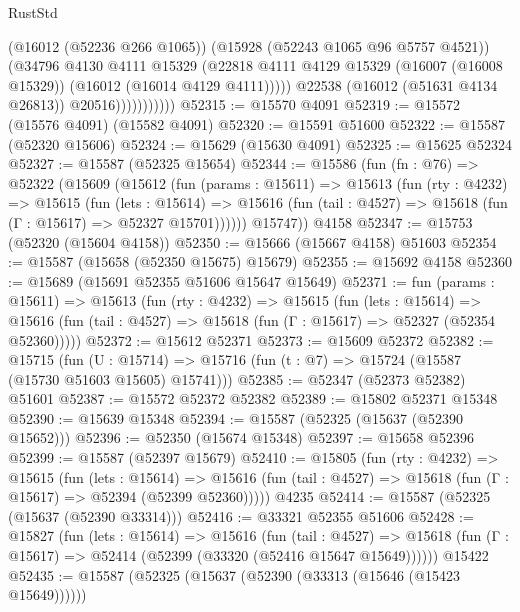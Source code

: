 \begin{lexlean}{RustStd}
\begin{coremodule}
                            (@16012 (@52236 @266 @1065))
                            (@15928 (@52243 @1065 @96 @5757 @4521))
                            (@34796
                              @4130
                              @4111
                              @15329
                              (@22818
                                @4111
                                @4129
                                @15329
                                (@16007 (@16008 @15329))
                                (@16012 (@16014 @4129 @4111)))))
                          @22538
                          (@16012 (@51631 @4134 @26813))
                          @20516)))))))))))
@52315 := @15570 @4091
@52319 := @15572 (@15576 @4091) (@15582 @4091)
@52320 := @15591 @51600
@52322 := @15587 (@52320 @15606)
@52324 := @15629 (@15630 @4091)
@52325 := @15625 @52324
@52327 := @15587 (@52325 @15654)
@52344 := @15586
    (fun (fn : @76) =>
    @52322
      (@15609
        (@15612
          (fun (params : @15611) =>
          @15613
            (fun (rty : @4232) =>
            @15615
              (fun (lets : @15614) =>
              @15616 (fun (tail : @4527) => @15618 (fun (Γ : @15617) => @52327 @15701))))))
        @15747))
    @4158
@52347 := @15753 (@52320 (@15604 @4158))
@52350 := @15666 (@15667 @4158) @51603
@52354 := @15587 (@15658 (@52350 @15675) @15679)
@52355 := @15692 @4158
@52360 := @15689 (@15691 @52355 @51606 @15647 @15649)
@52371 := fun (params : @15611) =>
  @15613
    (fun (rty : @4232) =>
    @15615
      (fun (lets : @15614) =>
      @15616 (fun (tail : @4527) => @15618 (fun (Γ : @15617) => @52327 (@52354 @52360)))))
@52372 := @15612 @52371
@52373 := @15609 @52372
@52382 := @15715
    (fun (U : @15714) => @15716 (fun (t : @7) => @15724 (@15587 (@15730 @51603 @15605) @15741)))
@52385 := @52347 (@52373 @52382) @51601
@52387 := @15572 @52372 @52382
@52389 := @15802 @52371 @15348
@52390 := @15639 @15348
@52394 := @15587 (@52325 (@15637 (@52390 @15652)))
@52396 := @52350 (@15674 @15348)
@52397 := @15658 @52396
@52399 := @15587 (@52397 @15679)
@52410 := @15805
    (fun (rty : @4232) =>
    @15615
      (fun (lets : @15614) =>
      @15616 (fun (tail : @4527) => @15618 (fun (Γ : @15617) => @52394 (@52399 @52360)))))
    @4235
@52414 := @15587 (@52325 (@15637 (@52390 @33314)))
@52416 := @33321 @52355 @51606
@52428 := @15827
    (fun (lets : @15614) =>
    @15616
      (fun (tail : @4527) =>
      @15618 (fun (Γ : @15617) => @52414 (@52399 (@33320 (@52416 @15647 @15649))))))
    @15422
@52435 := @15587 (@52325 (@15637 (@52390 (@33313 (@15646 (@15423 @15649))))))

\end{coremodule}
\end{lexlean}
